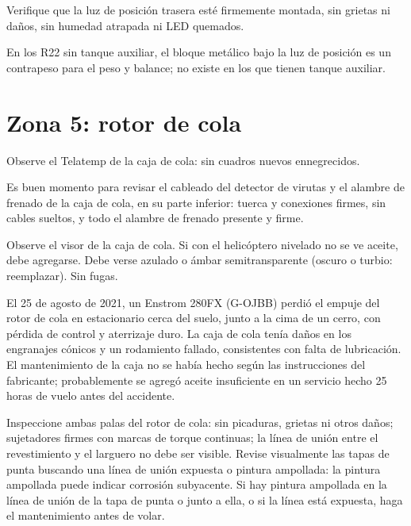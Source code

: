 Verifique que la luz de posición trasera esté firmemente montada, sin grietas ni daños, sin humedad atrapada ni LED quemados.

\begin{nota}
En los R22 sin tanque auxiliar, el bloque metálico bajo la luz de posición es un contrapeso para el peso y balance; no existe en los que tienen tanque auxiliar.
\end{nota}

\section{Zona 5: rotor de cola}

Observe el Telatemp de la caja de cola: sin cuadros nuevos ennegrecidos.

\begin{nota}
Es buen momento para revisar el cableado del detector de virutas y el alambre de frenado de la caja de cola, en su parte inferior: tuerca y conexiones firmes, sin cables sueltos, y todo el alambre de frenado presente y firme.
\end{nota}

Observe el visor de la caja de cola. Si con el helicóptero nivelado no se ve aceite, debe agregarse. Debe verse azulado o ámbar semitransparente (oscuro o turbio: reemplazar). Sin fugas.

\begin{caso}
El 25 de agosto de 2021, un Enstrom 280FX (G-OJBB) perdió el empuje del rotor de cola en estacionario cerca del suelo, junto a la cima de un cerro, con pérdida de control y aterrizaje duro. La caja de cola tenía daños en los engranajes cónicos y un rodamiento fallado, consistentes con falta de lubricación. El mantenimiento de la caja no se había hecho según las instrucciones del fabricante; probablemente se agregó aceite insuficiente en un servicio hecho 25 horas de vuelo antes del accidente.
\end{caso}

Inspeccione ambas palas del rotor de cola: sin picaduras, grietas ni otros daños; sujetadores firmes con marcas de torque continuas; la línea de unión entre el revestimiento y el larguero no debe ser visible. Revise visualmente las tapas de punta buscando una línea de unión expuesta o pintura ampollada: la pintura ampollada puede indicar corrosión subyacente. Si hay pintura ampollada en la línea de unión de la tapa de punta o junto a ella, o si la línea está expuesta, haga el mantenimiento antes de volar.

